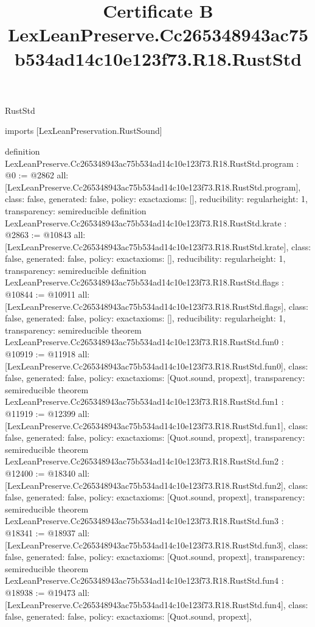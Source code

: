 \begin{lexlean}{RustStd}
\title{Certificate B LexLeanPreserve.Cc265348943ac75b534ad14c10e123f73.R18.RustStd}
\begin{coremodule}
imports [LexLeanPreservation.RustSound]

definition LexLeanPreserve.Cc265348943ac75b534ad14c10e123f73.R18.RustStd.program : @0 := @2862 {
  all: [LexLeanPreserve.Cc265348943ac75b534ad14c10e123f73.R18.RustStd.program],
  class: false,
  generated: false,
  policy: exact{axioms: []},
  reducibility: regular{height: 1},
  transparency: semireducible
}
definition LexLeanPreserve.Cc265348943ac75b534ad14c10e123f73.R18.RustStd.krate : @2863 := @10843 {
  all: [LexLeanPreserve.Cc265348943ac75b534ad14c10e123f73.R18.RustStd.krate],
  class: false,
  generated: false,
  policy: exact{axioms: []},
  reducibility: regular{height: 1},
  transparency: semireducible
}
definition LexLeanPreserve.Cc265348943ac75b534ad14c10e123f73.R18.RustStd.flags : @10844 := @10911 {
  all: [LexLeanPreserve.Cc265348943ac75b534ad14c10e123f73.R18.RustStd.flags],
  class: false,
  generated: false,
  policy: exact{axioms: []},
  reducibility: regular{height: 1},
  transparency: semireducible
}
theorem LexLeanPreserve.Cc265348943ac75b534ad14c10e123f73.R18.RustStd.fun0 : @10919 := @11918 {
  all: [LexLeanPreserve.Cc265348943ac75b534ad14c10e123f73.R18.RustStd.fun0],
  class: false,
  generated: false,
  policy: exact{axioms: [Quot.sound, propext]},
  transparency: semireducible
}
theorem LexLeanPreserve.Cc265348943ac75b534ad14c10e123f73.R18.RustStd.fun1 : @11919 := @12399 {
  all: [LexLeanPreserve.Cc265348943ac75b534ad14c10e123f73.R18.RustStd.fun1],
  class: false,
  generated: false,
  policy: exact{axioms: [Quot.sound, propext]},
  transparency: semireducible
}
theorem LexLeanPreserve.Cc265348943ac75b534ad14c10e123f73.R18.RustStd.fun2 : @12400 := @18340 {
  all: [LexLeanPreserve.Cc265348943ac75b534ad14c10e123f73.R18.RustStd.fun2],
  class: false,
  generated: false,
  policy: exact{axioms: [Quot.sound, propext]},
  transparency: semireducible
}
theorem LexLeanPreserve.Cc265348943ac75b534ad14c10e123f73.R18.RustStd.fun3 : @18341 := @18937 {
  all: [LexLeanPreserve.Cc265348943ac75b534ad14c10e123f73.R18.RustStd.fun3],
  class: false,
  generated: false,
  policy: exact{axioms: [Quot.sound, propext]},
  transparency: semireducible
}
theorem LexLeanPreserve.Cc265348943ac75b534ad14c10e123f73.R18.RustStd.fun4 : @18938 := @19473 {
  all: [LexLeanPreserve.Cc265348943ac75b534ad14c10e123f73.R18.RustStd.fun4],
  class: false,
  generated: false,
  policy: exact{axioms: [Quot.sound, propext]},
}
\end{coremodule}
\end{lexlean}
